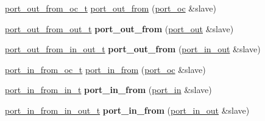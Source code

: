 \textbf{ }\par
\begin{DoxyCompactItemize}
\item 
\hyperlink{classhwlib_1_1port__out__from__oc__t}{port\+\_\+out\+\_\+from\+\_\+oc\+\_\+t} \hyperlink{namespacehwlib_a7ee5e8d765c714a5d0bedfa092efe4db}{port\+\_\+out\+\_\+from} (\hyperlink{classhwlib_1_1port__oc}{port\+\_\+oc} \&slave)
\item 
\mbox{\label{namespacehwlib_a242b19bea33930fa7785c2a1e85fac89}} 
\hyperlink{classhwlib_1_1port__out__from__out__t}{port\+\_\+out\+\_\+from\+\_\+out\+\_\+t} {\bfseries port\+\_\+out\+\_\+from} (\hyperlink{classhwlib_1_1port__out}{port\+\_\+out} \&slave)
\item 
\mbox{\label{namespacehwlib_a397b263eb24e0ec088734b32375917b8}} 
\hyperlink{classhwlib_1_1port__out__from__in__out__t}{port\+\_\+out\+\_\+from\+\_\+in\+\_\+out\+\_\+t} {\bfseries port\+\_\+out\+\_\+from} (\hyperlink{classhwlib_1_1port__in__out}{port\+\_\+in\+\_\+out} \&slave)
\end{DoxyCompactItemize}

\textbf{ }\par
\begin{DoxyCompactItemize}
\item 
\hyperlink{classhwlib_1_1port__in__from__oc__t}{port\+\_\+in\+\_\+from\+\_\+oc\+\_\+t} \hyperlink{namespacehwlib_a886e9f3e453056786f7329bfdc587d7b}{port\+\_\+in\+\_\+from} (\hyperlink{classhwlib_1_1port__oc}{port\+\_\+oc} \&slave)
\item 
\mbox{\label{namespacehwlib_a6e7e586b6cd303801bfe5e4a794f02d5}} 
\hyperlink{classhwlib_1_1port__in__from__in__t}{port\+\_\+in\+\_\+from\+\_\+in\+\_\+t} {\bfseries port\+\_\+in\+\_\+from} (\hyperlink{classhwlib_1_1port__in}{port\+\_\+in} \&slave)
\item 
\mbox{\label{namespacehwlib_ae5a7acfd4ed72e41bcbfbf1910068aa2}} 
\hyperlink{classhwlib_1_1port__in__from__in__out__t}{port\+\_\+in\+\_\+from\+\_\+in\+\_\+out\+\_\+t} {\bfseries port\+\_\+in\+\_\+from} (\hyperlink{classhwlib_1_1port__in__out}{port\+\_\+in\+\_\+out} \&slave)
\end{DoxyCompactItemize}

